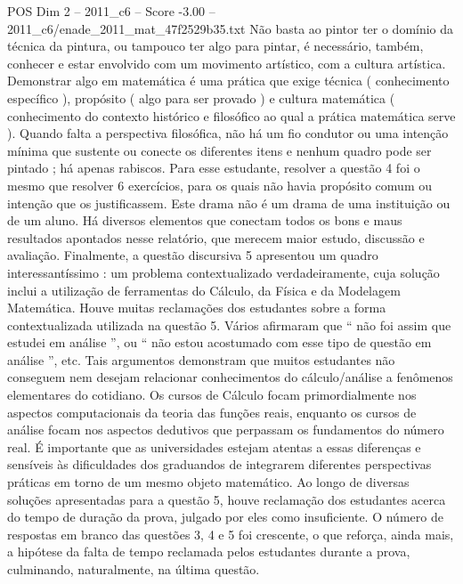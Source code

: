 \begin{textsample}{POS Dim 2 – 2011\_c6 – Score -3.00 – 2011\_c6/enade\_2011\_mat\_47f2529b35.txt}
Não basta ao pintor ter o domínio da técnica da pintura, ou tampouco ter algo para pintar, é necessário, também, conhecer e estar envolvido com um movimento artístico, com a cultura artística.
Demonstrar algo em matemática é uma prática que exige técnica ( conhecimento específico ), propósito ( algo para ser provado ) e cultura matemática ( conhecimento do contexto histórico e filosófico ao qual a prática matemática serve ).
Quando falta a perspectiva filosófica, não há um fio condutor ou uma intenção mínima que sustente ou conecte os diferentes itens e nenhum quadro pode ser pintado ; há apenas rabiscos.
Para esse estudante, resolver a questão 4 foi o mesmo que resolver 6 exercícios, para os quais não havia propósito comum ou intenção que os justificassem.
Este drama não é um drama de uma instituição ou de um aluno.
Há diversos elementos que conectam todos os bons e maus resultados apontados nesse relatório, que merecem maior estudo, discussão e avaliação.
Finalmente, a questão discursiva 5 apresentou um quadro interessantíssimo : um problema contextualizado verdadeiramente, cuja solução inclui a utilização de ferramentas do Cálculo, da Física e da Modelagem Matemática.
Houve muitas reclamações dos estudantes sobre a forma contextualizada utilizada na questão 5.
Vários afirmaram que “ não foi assim que estudei em análise ”, ou “ não estou acostumado com esse tipo de questão em análise ”, etc.
Tais argumentos demonstram que muitos estudantes não conseguem nem desejam relacionar conhecimentos do cálculo/análise a fenômenos elementares do cotidiano.
Os cursos de Cálculo focam primordialmente nos aspectos computacionais da teoria das funções reais, enquanto os cursos de análise focam nos aspectos dedutivos que perpassam os fundamentos do número real.
É importante que as universidades estejam atentas a essas diferenças e sensíveis às dificuldades dos graduandos de integrarem diferentes perspectivas práticas em torno de um mesmo objeto matemático.
Ao longo de diversas soluções apresentadas para a questão 5, houve reclamação dos estudantes acerca do tempo de duração da prova, julgado por eles como insuficiente.
O número de respostas em branco das questões 3, 4 e 5 foi crescente, o que reforça, ainda mais, a hipótese da falta de tempo reclamada pelos estudantes durante a prova, culminando, naturalmente, na última questão.

\end{textsample}

